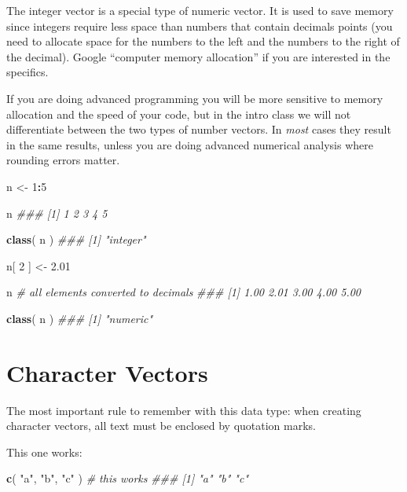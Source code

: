 \documentclass[]{book}
\newenvironment{Shaded}{\begin{snugshade}}{\end{snugshade}}
\newcommand{\CommentTok}[1]{\textcolor[rgb]{0.56,0.35,0.01}{\textit{#1}}}
\newcommand{\DecValTok}[1]{\textcolor[rgb]{0.00,0.00,0.81}{#1}}
\newcommand{\FloatTok}[1]{\textcolor[rgb]{0.00,0.00,0.81}{#1}}
\newcommand{\KeywordTok}[1]{\textcolor[rgb]{0.13,0.29,0.53}{\textbf{#1}}}
\newcommand{\NormalTok}[1]{#1}
\newcommand{\OperatorTok}[1]{\textcolor[rgb]{0.81,0.36,0.00}{\textbf{#1}}}
\newcommand{\StringTok}[1]{\textcolor[rgb]{0.31,0.60,0.02}{#1}}
\theoremstyle{definition}
\theoremstyle{definition}
\theoremstyle{definition}
\theoremstyle{remark}
\begin{document}
The integer vector is a special type of numeric vector. It is used to
save memory since integers require less space than numbers that contain
decimals points (you need to allocate space for the numbers to the left
and the numbers to the right of the decimal). Google ``computer memory
allocation'' if you are interested in the specifics.

If you are doing advanced programming you will be more sensitive to
memory allocation and the speed of your code, but in the intro class we
will not differentiate between the two types of number vectors. In
\emph{most} cases they result in the same results, unless you are doing
advanced numerical analysis where rounding errors matter.

\begin{Shaded}
\begin{Highlighting}[]

\NormalTok{n <-}\StringTok{ }\DecValTok{1}\OperatorTok{:}\DecValTok{5}

\NormalTok{n}
\CommentTok{### [1] 1 2 3 4 5}

\KeywordTok{class}\NormalTok{( n )}
\CommentTok{### [1] "integer"}

\NormalTok{n[ }\DecValTok{2}\NormalTok{ ] <-}\StringTok{ }\FloatTok{2.01}

\NormalTok{n  }\CommentTok{# all elements converted to decimals}
\CommentTok{### [1] 1.00 2.01 3.00 4.00 5.00}

\KeywordTok{class}\NormalTok{( n )}
\CommentTok{### [1] "numeric"}
\end{Highlighting}
\end{Shaded}

\hypertarget{character-vectors}{%
\section{Character Vectors}\label{character-vectors}}

The most important rule to remember with this data type: when creating
character vectors, all text must be enclosed by quotation marks.

This one works:

\begin{Shaded}
\begin{Highlighting}[]

\KeywordTok{c}\NormalTok{( }\StringTok{"a"}\NormalTok{, }\StringTok{"b"}\NormalTok{, }\StringTok{"c"}\NormalTok{ )   }\CommentTok{# this works}
\CommentTok{### [1] "a" "b" "c"}
\end{Highlighting}
\end{Shaded}
\end{document}
